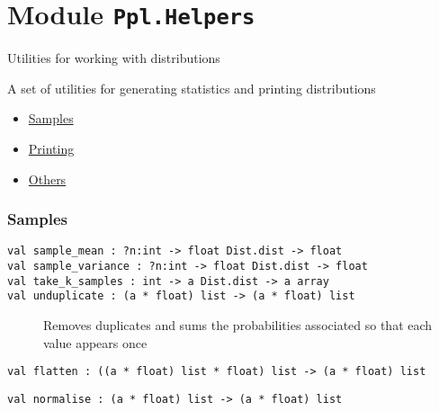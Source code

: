 \section{\texorpdfstring{Module
\texttt{Ppl.Helpers}}{Module Ppl.Helpers}}\label{module-ppl.helpers}

Utilities for working with distributions

A set of utilities for generating statistics and printing distributions

\begin{itemize}
\tightlist
\item
  \protect\hyperlink{samples}{Samples}
\item
  \protect\hyperlink{print}{Printing}
\item
  \protect\hyperlink{otherux5fhelpers}{Others}
\end{itemize}

\hypertarget{samples}{\subsubsection{\texorpdfstring{\protect\hyperlink{samples}{}Samples}{Samples}}\label{samples}}

\begin{description}
\item[{\protect\hyperlink{val-sampleux5fmean}{}\texttt{val\ sample\_mean\ :\ ?⁠n:int\ -\textgreater{}\ float\ Dist.dist\ -\textgreater{}\ float}\\
\protect\hyperlink{val-sampleux5fvariance}{}\texttt{val\ sample\_variance\ :\ ?⁠n:int\ -\textgreater{}\ float\ Dist.dist\ -\textgreater{}\ float}\\
\protect\hyperlink{val-takeux5fkux5fsamples}{}\texttt{val\ take\_k\_samples\ :\ int\ -\textgreater{}\ \textquotesingle{}a\ Dist.dist\ -\textgreater{}\ \textquotesingle{}a\ array}\\
\protect\hyperlink{val-unduplicate}{}\texttt{val\ unduplicate\ :\ (\textquotesingle{}a\ *\ float)\ list\ -\textgreater{}\ (\textquotesingle{}a\ *\ float)\ list}}]
Removes duplicates and sums the probabilities associated so that each
value appears once
\end{description}

\protect\hyperlink{val-flatten}{}\texttt{val\ flatten\ :\ ((\textquotesingle{}a\ *\ float)\ list\ *\ float)\ list\ -\textgreater{}\ (\textquotesingle{}a\ *\ float)\ list}

\protect\hyperlink{val-normalise}{}\texttt{val\ normalise\ :\ (\textquotesingle{}a\ *\ float)\ list\ -\textgreater{}\ (\textquotesingle{}a\ *\ float)\ list}

